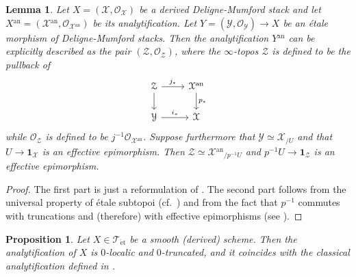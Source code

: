 \documentclass[12pt,a4paper,reqno]{amsart}
\theoremstyle{plain}
\newtheorem{lem}[thm]{Lemma}
\newtheorem{prop}[thm]{Proposition}
\theoremstyle{definition}
\theoremstyle{remark}
\numberwithin{equation}{section}
\begin{document}
\begin{lem} \label{lem:analytification_open}
	Let $X = ({\mathcal X}, {\mathcal O}_{\mathcal X})$ be a derived {Deligne-Mumford\xspace} stack and let $X{^\mathrm{an}} = ({\mathcal X}{^\mathrm{an}}, {\mathcal O}_{{\mathcal X}{^\mathrm{an}}})$ be its analytification.
	Let $Y = ({\mathcal Y}, {\mathcal O}_{\mathcal Y}) \to X$ be an \'etale morphism of {Deligne-Mumford\xspace} stacks.
	Then the analytification $Y{^\mathrm{an}}$ can be explicitly described as the pair $({\mathcal Z}, {\mathcal O}_{\mathcal Z})$, where the $\infty$-topos ${\mathcal Z}$ is defined to be the pullback of
	\[ \begin{tikzcd}
	{\mathcal Z} \arrow{r}{j_*} \arrow{d} & {\mathcal X}{^\mathrm{an}} \arrow{d}{p_*} \\
	{\mathcal Y} \arrow{r}{i_*} & {\mathcal X}
	\end{tikzcd} \]
	while ${\mathcal O}_{\mathcal Z}$ is defined to be $j{^{-1}} {\mathcal O}_{{\mathcal X}{^\mathrm{an}}}$.
	Suppose furthermore that ${\mathcal Y} \simeq {\mathcal X}_{/U}$ and that $U \to \mathbf 1_{\mathcal X}$ is an effective epimorphism.
	Then ${\mathcal Z} \simeq {\mathcal X}{^\mathrm{an}}_{/p{^{-1}} U}$ and $p{^{-1}} U \to \mathbf 1_{\mathcal Z}$ is an effective epimorphism.
\end{lem}

\begin{proof}
	The first part is just a reformulation of \cite[Lemma 2.1.3]{DAG-V}.
	The second part follows from the universal property of \'etale subtopoi (cf.\ \cite[6.3.5.8]{HTT}) and from the fact that $p{^{-1}}$ commutes with truncations and (therefore) with effective epimorphisms (see \cite[5.5.6.28]{HTT}).
\end{proof}

\begin{prop} \label{prop:analytification_smooth}
	Let $X \in {{\mathcal T}_{\mathrm{\acute{e}t}}}$ be a smooth (derived) scheme.
	Then the analytification of $X$ is $0$-localic and $0$-truncated, and it coincides with the classical analytification defined in \cite{SGA1}.
\end{prop}
\end{document}

